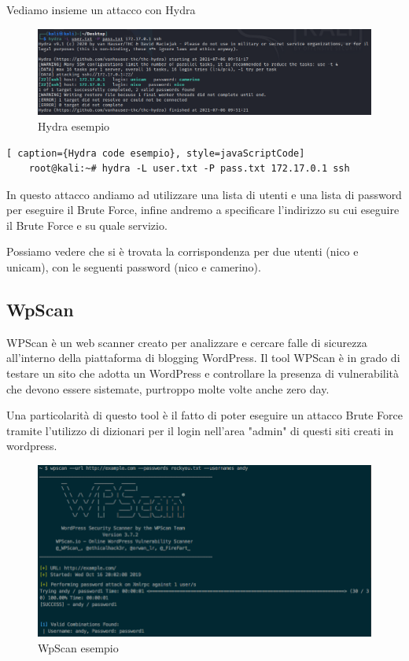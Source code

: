 Vediamo insieme un attacco con Hydra 

\begin{figure}[htpb!]
    \centering
    \includegraphics[width=\linewidth]{Immagini/5/hydra.png}
    \caption{Hydra esempio}
    \label{fig:Hydra esempio}
\end{figure}

\begin{lstlisting}[ caption={Hydra code esempio}, style=javaScriptCode]
    root@kali:~# hydra -L user.txt -P pass.txt 172.17.0.1 ssh
\end{lstlisting}

In questo attacco andiamo ad utilizzare una lista di utenti e una lista di password per eseguire il Brute Force, infine andremo a specificare l'indirizzo su cui eseguire il Brute Force e su quale servizio.

Possiamo vedere che si è trovata la corrispondenza per due utenti (nico e unicam), con le seguenti password (nico e camerino). 

\subsection{WpScan}

WPScan\cite{wpscan} è un web scanner creato per analizzare e cercare falle di sicurezza all’interno della piattaforma di blogging WordPress. Il tool WPScan è in grado di testare un sito che adotta un WordPress e controllare la presenza di vulnerabilità che devono essere sistemate, purtroppo molte volte anche zero day.

Una particolarità di questo tool è il fatto di poter eseguire un attacco Brute Force tramite l'utilizzo di dizionari per il login nell'area "admin" di questi siti creati in wordpress.

\begin{figure}[htpb!]
    \centering
    \includegraphics[width=\linewidth]{Immagini/5/wpscan_example.png}
    \caption{WpScan esempio\cite{wpscan_esempio}}
    \label{fig:WpScan esempio}
\end{figure}

